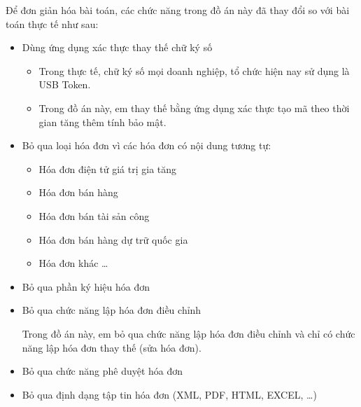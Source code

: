 Để đơn giản hóa bài toán, các chức năng trong đồ án này đã thay đổi so với bài toán thực tế như sau:

\begin{itemize}

\item Dùng ứng dụng xác thực thay thế chữ ký số

\begin{itemize}

\item Trong thực tế, chữ ký số mọi doanh nghiệp, tổ chức hiện nay sử dụng là USB Token.

\item Trong đồ án này, em thay thế bằng ứng dụng xác thực tạo mã theo thời gian tăng thêm tính bảo mật.

\end{itemize}

\item Bỏ qua loại hóa đơn vì các hóa đơn có nội dung tương tự:

\begin{itemize}

\item Hóa đơn điện tử giá trị gia tăng

\item Hóa đơn bán hàng

\item Hóa đơn bán tài sản công

\item Hóa đơn bán hàng dự trữ quốc gia

\item Hóa đơn khác \dots

\end{itemize}

\item Bỏ qua phần ký hiệu hóa đơn


\item Bỏ qua chức năng lập hóa đơn điều chỉnh

Trong đồ án này, em bỏ qua chức năng lập hóa đơn điều chỉnh và chỉ có chức năng lập hóa đơn thay thế (sửa hóa đơn).

\item Bỏ qua chức năng phê duyệt hóa đơn

\item Bỏ qua định dạng tập tin hóa đơn (XML, PDF, HTML, EXCEL, \dots)

\end{itemize}
